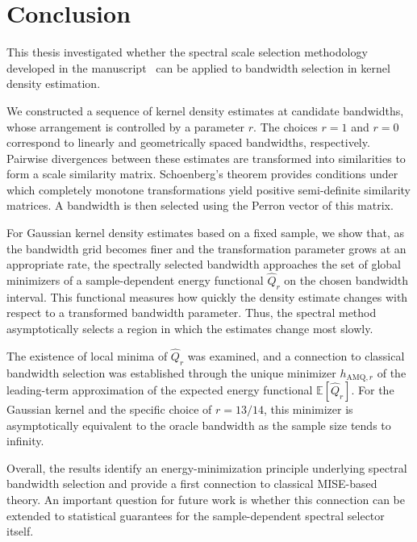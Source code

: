 \chapter{Conclusion}\label{chap:conclusion}

This thesis investigated whether the spectral scale selection methodology developed in the manuscript~\cite{Baralic2026} can be applied to bandwidth selection in kernel density estimation. 


We constructed a sequence of kernel density estimates at candidate bandwidths, whose arrangement is controlled by a parameter $r$. The choices $r=1$ and $r=0$ correspond to linearly and geometrically spaced bandwidths, respectively. Pairwise divergences between these estimates are transformed into similarities to form a scale similarity matrix. Schoenberg's theorem provides conditions under which completely monotone transformations yield positive semi-definite similarity matrices. A bandwidth is then selected using the Perron vector of this matrix.


For Gaussian kernel density estimates based on a fixed sample, we show that, as the bandwidth grid becomes finer and the transformation parameter grows at an appropriate rate, the spectrally selected bandwidth approaches the set of global minimizers of a sample-dependent energy functional $\hat{Q}_r$ on the chosen bandwidth interval. This functional measures how quickly the density estimate changes with respect to a transformed bandwidth parameter. Thus, the spectral method asymptotically selects a region in which the estimates change most slowly.


The existence of local minima of $\hat{Q}_r$ was examined, and a connection to classical bandwidth selection was established through the unique minimizer $h_{\text{AMQ},r}$ of the leading-term approximation of the expected energy functional $\mathbb{E}[\hat{Q}_r]$. For the Gaussian kernel and the specific choice of $r=13/14$, this minimizer is asymptotically equivalent to the oracle bandwidth as the sample size tends to infinity.

Overall, the results identify an energy-minimization principle underlying spectral bandwidth selection and provide a first connection to classical MISE-based theory. An important question for future work is whether this connection can be extended to statistical guarantees for the sample-dependent spectral selector itself.